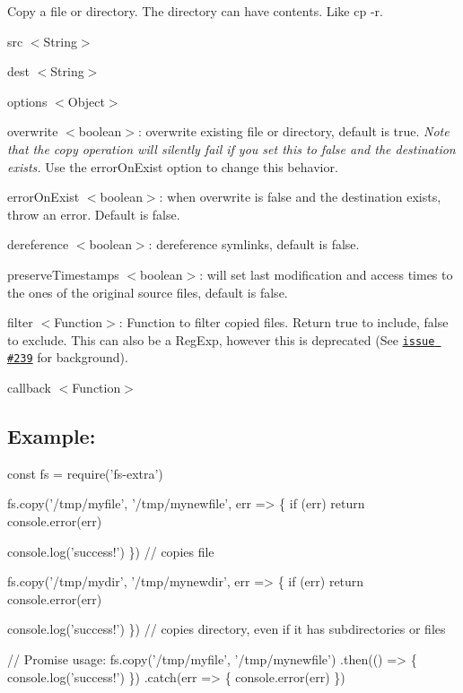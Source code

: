 Copy a file or directory. The directory can have contents. Like {\ttfamily cp -\/r}.


\begin{DoxyItemize}
\item {\ttfamily src} {\ttfamily $<$String$>$}
\item {\ttfamily dest} {\ttfamily $<$String$>$}
\item {\ttfamily options} {\ttfamily $<$Object$>$}
\begin{DoxyItemize}
\item {\ttfamily overwrite} {\ttfamily $<$boolean$>$}\+: overwrite existing file or directory, default is {\ttfamily true}. {\itshape Note that the copy operation will silently fail if you set this to {\ttfamily false} and the destination exists.} Use the {\ttfamily error\+On\+Exist} option to change this behavior.
\item {\ttfamily error\+On\+Exist} {\ttfamily $<$boolean$>$}\+: when {\ttfamily overwrite} is {\ttfamily false} and the destination exists, throw an error. Default is {\ttfamily false}.
\item {\ttfamily dereference} {\ttfamily $<$boolean$>$}\+: dereference symlinks, default is {\ttfamily false}.
\item {\ttfamily preserve\+Timestamps} {\ttfamily $<$boolean$>$}\+: will set last modification and access times to the ones of the original source files, default is {\ttfamily false}.
\item {\ttfamily filter} {\ttfamily $<$Function$>$}\+: Function to filter copied files. Return {\ttfamily true} to include, {\ttfamily false} to exclude. This can also be a Reg\+Exp, however this is deprecated (See \href{https://github.com/jprichardson/node-fs-extra/issues/239}{\tt issue \#239} for background).
\end{DoxyItemize}
\item {\ttfamily callback} {\ttfamily $<$Function$>$}
\end{DoxyItemize}

\subsection*{Example\+:}


\begin{DoxyCode}
const fs = require('fs-extra')

fs.copy('/tmp/myfile', '/tmp/mynewfile', err => \{
  if (err) return console.error(err)

  console.log('success!')
\}) // copies file

fs.copy('/tmp/mydir', '/tmp/mynewdir', err => \{
  if (err) return console.error(err)

  console.log('success!')
\}) // copies directory, even if it has subdirectories or files

// Promise usage:
fs.copy('/tmp/myfile', '/tmp/mynewfile')
.then(() => \{
  console.log('success!')
\})
.catch(err => \{
  console.error(err)
\})
\end{DoxyCode}


